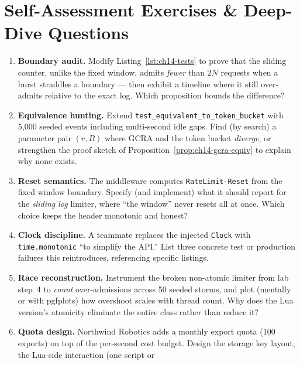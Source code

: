 \section{Self-Assessment Exercises \& Deep-Dive Questions}
\label{sec:ch14-exercises}

\begin{enumerate}[label=\textbf{E14.\arabic*.}, leftmargin=2.2cm]
  \item \textbf{Boundary audit.} Modify Listing~\ref{lst:ch14-tests} to
        prove that the sliding counter, unlike the fixed window, admits
        \emph{fewer} than $2N$ requests when a burst straddles a boundary
        --- then exhibit a timeline where it still over-admits relative to
        the exact log. Which proposition bounds the difference?
  \item \textbf{Equivalence hunting.} Extend
        \texttt{test\_equivalent\_to\_token\_bucket} with 5{,}000 seeded
        events including multi-second idle gaps. Find (by search) a
        parameter pair $(r, B)$ where GCRA and the token bucket
        \emph{diverge}, or strengthen the proof sketch of
        Proposition~\ref{prop:ch14-gcra-equiv} to explain why none exists.
  \item \textbf{Reset semantics.} The middleware computes
        \texttt{RateLimit-Reset} from the fixed window boundary. Specify
        (and implement) what it should report for the \emph{sliding log}
        limiter, where ``the window'' never resets all at once. Which
        choice keeps the header monotonic and honest?
  \item \textbf{Clock discipline.} A teammate replaces the injected
        \texttt{Clock} with \texttt{time.monotonic} ``to simplify the
        API.'' List three concrete test or production failures this
        reintroduces, referencing specific listings.
  \item \textbf{Race reconstruction.} Instrument the broken
        non-atomic limiter from lab step~4 to \emph{count} over-admissions
        across 50 seeded storms, and plot (mentally or with pgfplots) how
        overshoot scales with thread count. Why does the Lua version's
        atomicity eliminate the entire class rather than reduce it?
  \item \textbf{Quota design.} Northwind Robotics adds a monthly export
        quota (100 exports) on top of the per-second cost budget. Design
        the storage key layout, the Lua-side interaction (one script or

\end{enumerate}
